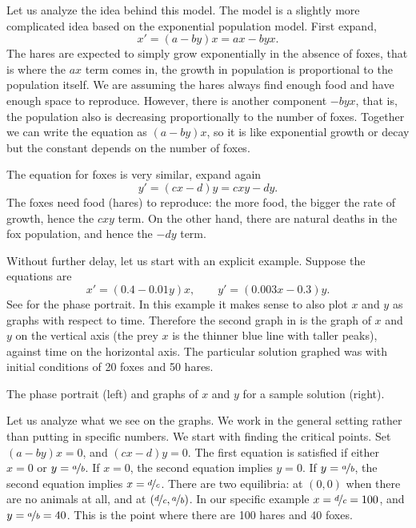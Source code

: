 \documentclass{ximera}
\begin{document}
Let us analyze the idea behind this model.  The model is a slightly more complicated idea based on the exponential population model. First expand,
\begin{equation*}
    x' = (a-by)x = ax - byx .
\end{equation*}
The hares are expected to simply grow exponentially in the absence of foxes, that is where the $ax$ term comes in, the growth in population is proportional to the population itself.  We are assuming the hares always find enough food and have enough space to reproduce.  However, there is another component $-byx$, that is, the population also is decreasing proportionally to the number of foxes.  Together we can write the equation as $(a-by)x$, so it is like exponential growth or decay but the constant depends on the number of foxes.

The equation for foxes is very similar, expand again
\begin{equation*}
    y' = (cx-d)y = cxy-dy .
\end{equation*}
The foxes need food (hares) to reproduce: the more food, the bigger the rate of growth, hence the $cxy$ term.  On the other hand, there are natural deaths in the fox population, and hence the $-dy$ term.

Without further delay, let us start with an explicit example.  Suppose the equations are 
\begin{equation*}
    x' = (0.4-0.01y)x, \qquad y' = (0.003x-0.3)y .
\end{equation*}
See  for the phase portrait.  In this example it makes sense to also plot $x$ and $y$ as graphs with respect to time. Therefore the second graph in  is the graph of $x$ and $y$ on the vertical axis (the prey $x$ is the thinner blue line with taller peaks), against time on the horizontal axis.  The particular solution graphed was with initial conditions of 20 foxes and 50 hares.
\begin{myfig}
    \capstart
    \caption{The phase portrait (left) and graphs of $x$ and $y$ for a sample solution (right). \label{fig:nlin-pred-prey}}
\end{myfig}

Let us analyze what we see on the graphs.  We work in the general setting rather than putting in specific numbers.  We start with finding the critical points.  Set $(a-by)x = 0$, and $(cx-d)y = 0$. The first equation is satisfied if either $x=0$ or $y=\nicefrac{a}{b}$.  If $x=0$, the second equation implies $y=0$.  If $y= \nicefrac{a}{b}$, the second equation implies $x=\nicefrac{d}{c}$. There are two equilibria: at $(0,0)$ when there are no animals at all, and at $(\nicefrac{d}{c},\nicefrac{a}{b})$. In our specific example $x = \nicefrac{d}{c} = 100$, and $y = \nicefrac{a}{b} = 40$. This is the point where there are 100 hares and 40 foxes.
\end{document}
